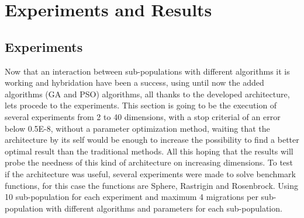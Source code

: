 \documentclass[runningheads]{llncs}
\begin{document}


\section{Experiments and Results}
\subsection{Experiments}
Now that an interaction between sub-populations with different algorithms it is working and  hybridation have been a success, using until now the added algorithms (GA and PSO) algorithms, all thanks to the 
developed architecture, lets procede to the experiments.
This section is going to be the execution of several experiments from 2 to 40 dimensions, with a stop criterial 
of an error below  0.5E-8, without a parameter optimization method, waiting that the architecture by its self
would be enough to increase the possibility to find a better optimal result than the traditional methods.
All this hoping that the results will probe the needness of this kind of architecture on increasing dimensions.
To test if the architecture was useful, several experiments were made to solve
benchmark functions, for this case the functions are Sphere, Rastrigin and Rosenbrock.
Using 10 sub-population for each experiment and maximum 4 migrations per sub-population with different algorithms and parameters for each sub-population.
\end{document}
